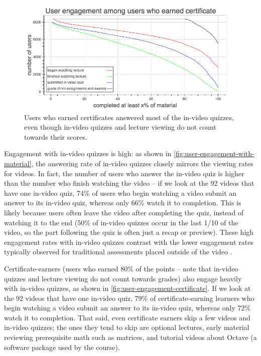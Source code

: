 \documentclass{sigchi}
\begin{document}
\begin{figure}
\includegraphics[width=1.0\columnwidth]{user-engagement-certificate}
\caption{Users who earned certificates answered most of the in-video quizzes, even though in-video quizzes and lecture viewing do not count towards their scores.}
\label{fig:user-engagement-certificate}
\end{figure}

Engagement with in-video quizzes is high: as shown in \autoref{fig:user-engagement-with-material}, the answering rate of in-video quizzes closely mirrors the viewing rates for videos. In fact, the number of users who answer the in-video quiz is higher than the number who finish watching the video -- if we look at the 92 videos that have one in-video quiz, 74\% of users who begin watching a video submit an answer to its in-video quiz, whereas only 66\% watch it to completion. This is likely because users often leave the video after completing the quiz, instead of watching it to the end (50\% of in-video quizzes occur in the last 1/10 of the video, so the part following the quiz is often just a recap or preview). These high engagement rates with in-video quizzes contrast with the lower engagement rates typically observed for traditional assessments placed outside of the video \cite{renedisengagement} \cite{ashton}.


Certificate-earners (users who earned 80\% of the points -- note that in-video quizzes and lecture viewing do not count towards grades) also engage heavily with in-video quizzes, as shown in \autoref{fig:user-engagement-certificate}. If we look at the 92 videos that have one in-video quiz, 79\% of certificate-earning learners who begin watching a video submit an answer to its in-video quiz, whereas only 72\% watch it to completion. That said, even certificate earners skip a few videos and in-video quizzes; the ones they tend to skip are optional lectures, early material reviewing prerequisite math such as matrices, and tutorial videos about Octave (a software package used by the course).
\end{document}
